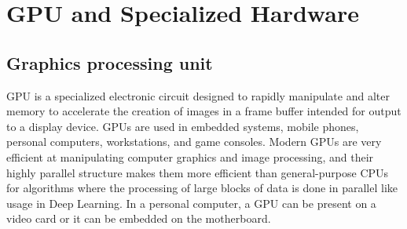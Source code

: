 \section{GPU and Specialized Hardware}
\label{chap:GPU and Specialized Hardware}

\subsection{Graphics processing unit}
GPU is a specialized electronic circuit designed to rapidly manipulate and alter memory to accelerate the creation of images in a frame buffer intended for output to a display device. GPUs are used in embedded systems, mobile phones, personal computers, workstations, and game consoles. Modern GPUs are very efficient at manipulating computer graphics and image processing, and their highly parallel structure makes them more efficient than general-purpose CPUs for algorithms where the processing of large blocks of data is done in parallel like usage in Deep Learning. In a personal computer, a GPU can be present on a video card or it can be embedded on the motherboard.\cite{web008}
